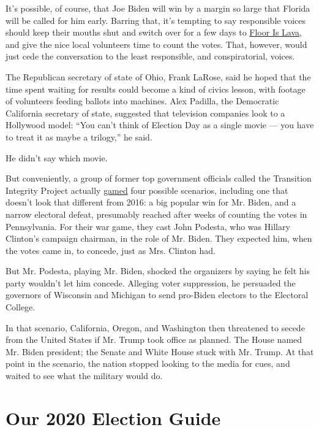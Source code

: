 It's possible, of course, that Joe Biden will win by a margin so large
that Florida will be called for him early. Barring that, it's tempting
to say responsible voices should keep their mouths shut and switch over
for a few days to
\href{https://www.youtube.com/watch?v=A3zkedeWbYw}{Floor Is Lava}, and
give the nice local volunteers time to count the votes. That, however,
would just cede the conversation to the least responsible, and
conspiratorial, voices.

The Republican secretary of state of Ohio, Frank LaRose, said he hoped
that the time spent waiting for results could become a kind of civics
lesson, with footage of volunteers feeding ballots into machines. Alex
Padilla, the Democratic California secretary of state, suggested that
television companies look to a Hollywood model: ``You can't think of
Election Day as a single movie --- you have to treat it as maybe a
trilogy,'' he said.

He didn't say which movie.

But conveniently, a group of former top government officials called the
Transition Integrity Project actually
\href{https://www.bostonglobe.com/2020/07/25/nation/bipartisan-group-secretly-gathered-game-out-contested-trump-biden-election-it-wasnt-pretty/}{gamed}
four possible scenarios, including one that doesn't look that different
from 2016: a big popular win for Mr. Biden, and a narrow electoral
defeat, presumably reached after weeks of counting the votes in
Pennsylvania. For their war game, they cast John Podesta, who was
Hillary Clinton's campaign chairman, in the role of Mr. Biden. They
expected him, when the votes came in, to concede, just as Mrs. Clinton
had.

But Mr. Podesta, playing Mr. Biden, shocked the organizers by saying he
felt his party wouldn't let him concede. Alleging voter suppression, he
persuaded the governors of Wisconsin and Michigan to send pro-Biden
electors to the Electoral College.

In that scenario, California, Oregon, and Washington then threatened to
secede from the United States if Mr. Trump took office as planned. The
House named Mr. Biden president; the Senate and White House stuck with
Mr. Trump. At that point in the scenario, the nation stopped looking to
the media for cues, and waited to see what the military would do.

\hypertarget{our-2020-election-guide}{%
\section{Our 2020 Election Guide}\label{our-2020-election-guide}}

